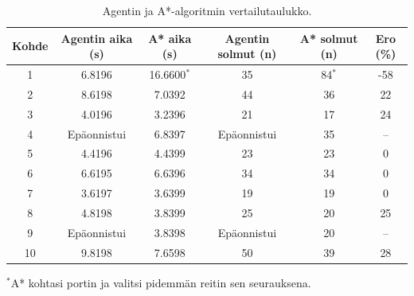 \documentclass[utf8]{gradu3}
\begin{document}
\begin{table}[htp]
\centering
\caption{Agentin ja A*-algoritmin vertailutaulukko.}
\label{vertailutaulukko}
\begin{tabular}{cccccc}
\hline
Kohde & Agentin aika (s) & A* aika (s) & Agentin solmut (n) & A* solmut (n) & Ero (\%) \\
\hline \hline
1 & 6.8196 & 16.6600$^*$ & 35 & 84$^*$ & -58 \\

2 & 8.6198 & 7.0392 & 44 & 36 & 22 \\

3 & 4.0196 & 3.2396 & 21 & 17 & 24 \\

4 & Epäonnistui & 6.8397 & Epäonnistui & 35 & -- \\

5 & 4.4196 & 4.4399 & 23 & 23 & 0 \\

6 & 6.6195 & 6.6396 & 34 & 34 & 0 \\

7 & 3.6197 & 3.6399 & 19 & 19 & 0 \\

8 & 4.8198 & 3.8399 & 25 & 20 & 25 \\

9 & Epäonnistui & 3.8398 & Epäonnistui & 20 & -- \\

10 & 9.8198 & 7.6598 & 50 & 39 & 28 \\

\hline

\end{tabular}

$^*$A* kohtasi portin ja valitsi pidemmän reitin sen seurauksena.

\end{table}
\end{document}
